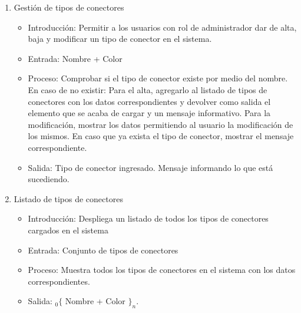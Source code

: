 \begin{enumerate}
			\item Gestión de tipos de conectores
				\begin{itemize}
					\item Introducción: Permitir a los usuarios con rol de administrador dar de alta, baja y modificar un tipo de conector en el sistema.
					\item Entrada: Nombre + Color
					\item Proceso: Comprobar si el tipo de conector existe por medio del nombre. En caso de no existir: 
					Para el alta, agregarlo al listado de tipos de conectores con los datos correspondientes y devolver como salida el elemento que se acaba de cargar y un mensaje informativo. 
					Para la modificación, mostrar los datos permitiendo al usuario la modificación de los mismos. 
					En caso que ya exista el tipo de conector, mostrar el mensaje correspondiente.
					\item Salida: Tipo de conector ingresado. Mensaje informando lo que está sucediendo.
				\end{itemize}
			
			\item Listado de tipos de conectores
				\begin{itemize}
					\item Introducción: Despliega un listado de todos los tipos de conectores cargados en el sistema
					\item Entrada: Conjunto de tipos de conectores
					\item Proceso: Muestra todos los tipos de conectores en el sistema con los datos correspondientes.
					\item Salida: ${}_{0}\{$ Nombre + Color $\}_n$.
				\end{itemize}
			

\end{enumerate}

